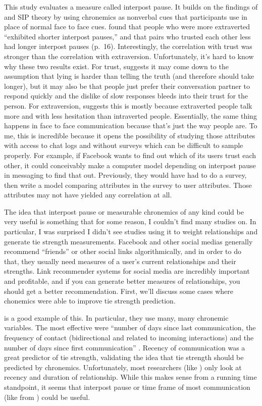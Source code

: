 \documentclass[
  stu]{apa7}
\begin{document}
This study evaluates a measure called interpost pause. It builds on the
findings of \textcite{kalman11} and SIP theory by using chronemics as
nonverbal cues that participants use in place of normal face to face
cues. \textcite{kalman13} found that people who were more extraverted
``exhibited shorter interpost pauses,'' and that pairs who trusted each
other less had longer interpost pauses (p.~16). Interestingly, the
correlation with trust was stronger than the correlation with
extraversion. Unfortunately, it's hard to know why these two results
exist. For trust, \textcite{kalman13} suggests it may come down to the
assumption that lying is harder than telling the truth (and therefore
should take longer), but it may also be that people just prefer their
conversation partner to respond quickly and the dislike of slow
responses bleeds into their trust for the person. For extraversion,
\textcite{kalman13} suggests this is mostly because extraverted people
talk more and with less hesitation than intraverted people. Essentially,
the same thing happens in face to face communication because that's just
the way people are. To me, this is incredible because it opens the
possibility of studying those attributes with access to chat logs and
without surveys which can be difficult to sample properly. For example,
if Facebook wants to find out which of its users trust each other, it
could conceivably make a computer model depending on interpost pause in
messaging to find that out. Previously, they would have had to do a
survey, then write a model comparing attributes in the survey to user
attributes. Those attributes may not have yielded any correlation at
all.

The idea that interpost pause or measurable chronemics of any kind could
be very useful is something that for some reason, I couldn't find many
studies on. In particular, I was surprised I didn't see studies using it
to weight relationships and generate tie strength measurements. Facebook
and other social medias generally recommend ``friends'' or other social
links algorithmically, and in order to do that, they usually need
measures of a user's current relationships and their strengths. Link
recommender systems for social media are incredibly important and
profitable, and if you can generate better measures of relationships,
you should get a better recommendation. First, we'll discuss some cases
where chonemics were able to improve tie strength prediction.

\textcite{arnaboldi13} is a good example of this. In particular, they
use many, many chronemic variables. The most effective were ``number of
days since last communication, the frequency of contact (bidirectional
and related to incoming interactions) and the number of days since first
communication'' \autocite[ 1137]{arnaboldi13}. Recency of communication
was a great predictor of tie strength, validating the idea that tie
strength should be predicted by chronemics. Unfortunately, most
researchers (like \textcite{servia-rodriguez14}) only look at recency
and duration of relationship. While this makes sense from a running time
standpoint, it seems that interpost pause or time frame of most
communication (like from \textcite{walther95}) could be useful.
\end{document}
